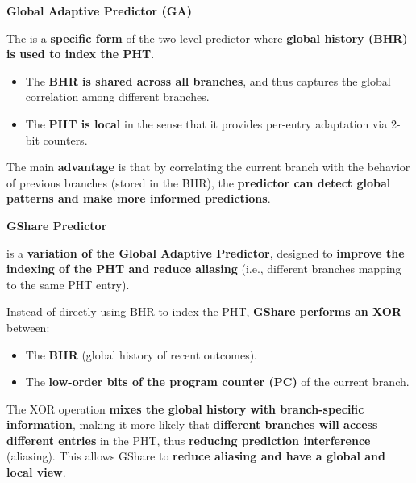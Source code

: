 \highspace
\begin{flushleft}
    \textcolor{Green3}{ \textbf{Global Adaptive Predictor (GA)}}
\end{flushleft}
The  is a \textbf{specific form} of the two-level predictor where \textbf{global history (BHR) is used to index the PHT}.
\begin{itemize}
    \item The \textbf{BHR is shared across all branches}, and thus captures the global correlation among different branches.
    \item The \textbf{PHT is local} in the sense that it provides per-entry adaptation via 2-bit counters.
\end{itemize}
The main \textcolor{Green3}{\textbf{advantage}} is that by correlating the current branch with the behavior of previous branches (stored in the BHR), the \textbf{predictor can detect global patterns and make more informed predictions}.

\highspace
\begin{flushleft}
    \textcolor{Green3}{ \textbf{GShare Predictor}}
\end{flushleft}
 is a \textbf{variation of the Global Adaptive Predictor}, designed to \textbf{improve the indexing of the PHT and reduce aliasing} (i.e., different branches mapping to the same PHT entry).

\highspace
Instead of directly using BHR to index the PHT, \textbf{GShare performs an XOR} between:
\begin{itemize}
    \item The \textbf{BHR} (global history of recent outcomes).
    \item The \textbf{low-order bits of the program counter (PC)} of the current branch.
\end{itemize}
The XOR operation \textbf{mixes the global history with branch-specific information}, making it more likely that \textbf{different branches will access different entries} in the PHT, thus \textbf{reducing prediction interference} (aliasing). This allows GShare to \textcolor{Green3}{\textbf{reduce aliasing and have a global and local view}}.

